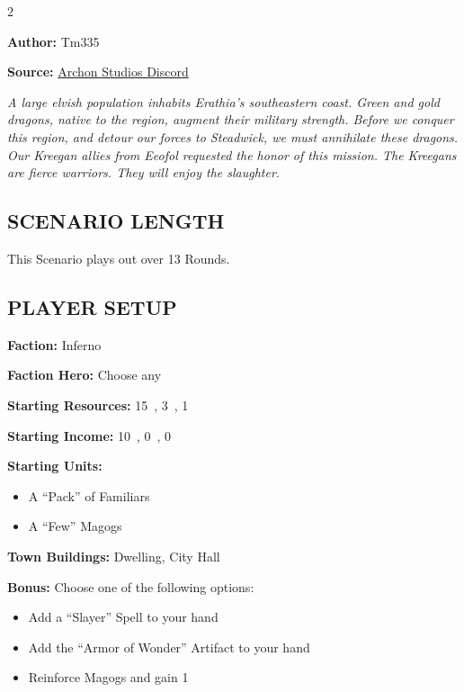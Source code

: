 \cleardoublepage{}

\begin{multicols*}{2}

\textbf{Author:} Tm335

\textbf{Source:} \href{https://discord.com/channels/740870068178649108/1243057664666238996/1243057664666238996}{Archon Studios Discord}

\textit{A large elvish population inhabits Erathia's southeastern coast.
Green and gold dragons, native to the region, augment their military strength.
Before we conquer this region, and detour our forces to Steadwick, we must annihilate these dragons.
Our Kreegan allies from Eeofol requested the honor of this mission.
The Kreegans are fierce warriors.
They will enjoy the slaughter.
}

\subsection*{\MakeUppercase{Scenario Length}}

This Scenario plays out over 13 Rounds.

\subsection*{\MakeUppercase{Player Setup}}

\textbf{Faction:} Inferno

\textbf{Faction Hero:} Choose any

\textbf{Starting Resources:} 15~, 3~, 1~

\textbf{Starting Income:} 10~, 0~, 0~

\textbf{Starting Units:}

\begin{itemize}
  \item A ``Pack'' of Familiars
  \item A ``Few'' Magogs
\end{itemize}

\textbf{Town Buildings:}  Dwelling, City Hall

\textbf{Bonus:} Choose one of the following options:
\begin{itemize}
  \item Add a ``Slayer'' Spell to your hand
  \item Add the ``Armor of Wonder'' Artifact to your hand
  \item Reinforce Magogs and gain 1~
\end{itemize}


\end{multicols*}
